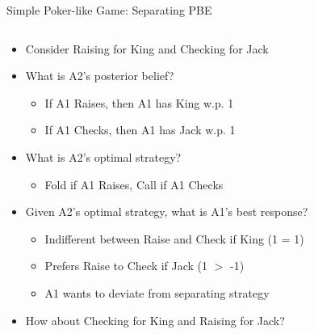 \documentclass[11pt,aspectratio=169,handout]{beamer}
\begin{document}
  
  \begin{frame}{Simple Poker-like Game: Separating PBE}
   \begin{columns}
    \begin{column}{0.6\textwidth}
     \begin{itemize}[<+->] \scriptsize
     \setlength{\itemsep}{0.7em}
      \item Consider Raising for King and Checking for Jack
      \item What is A2's posterior belief?
      \begin{itemize}\scriptsize
       \item If A1 Raises, then A1 has King w.p. 1
       \item If A1 Checks, then A1 has Jack w.p. 1
      \end{itemize}
      \item What is A2's optimal strategy?
      \begin{itemize}\scriptsize
       \item Fold if A1 Raises, Call if A1 Checks
      \end{itemize}
      \item Given A2's optimal strategy, what is A1's best response?
      \begin{itemize}\scriptsize
       \item Indifferent between Raise and Check if King (1 = 1)
       \item Prefers Raise to Check if Jack (1 $>$ -1)
       \item A1 wants to \alert{deviate} from separating strategy
      \end{itemize}
      \item How about Checking for King and Raising for Jack?
     \end{itemize}
    \end{column}
    \begin{column}{0.4\textwidth}   
     \begin{center}
\end{center}
\end{column}
\end{columns}
\end{frame}
\end{document}
